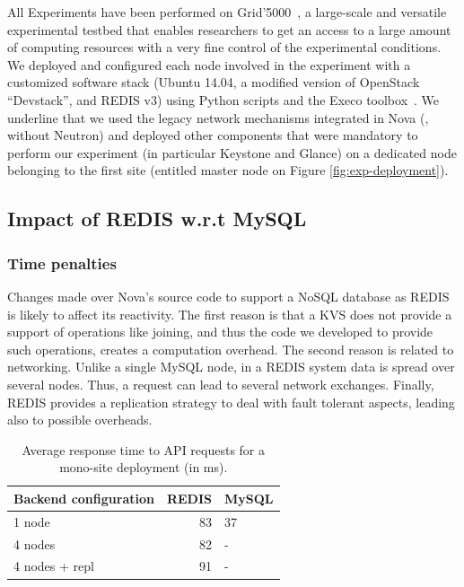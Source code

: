 All Experiments have been performed on Grid'5000~\cite{grid5000}, a large-scale
and versatile experimental testbed that enables researchers to get an access to
a large amount of computing resources %
with a very fine control of the experimental conditions. We deployed and
configured each node involved in the experiment with a customized software stack
(Ubuntu 14.04, a modified version of OpenStack ``Devstack'', and REDIS v3) using
Python scripts and the Execo toolbox~\cite{imbert:hal-00861886}. We underline
that we used the legacy network mechanisms integrated in Nova (\ie, without
Neutron) and deployed other components that were mandatory to perform our
experiment (in particular Keystone and Glance) on a dedicated node belonging to
the first site (entitled master node on Figure \ref{fig:exp-deployment}).

\subsection{Impact of REDIS w.r.t MySQL\label{subsec:monosite_experiments}}

\subsubsection{Time penalties}
Changes made over Nova's source code to support a NoSQL database as REDIS is
likely to affect its reactivity. The first reason is that a KVS does
not provide a support of operations like joining, and thus the code we developed
to provide such operations, creates a computation overhead. The second reason is
related to networking. Unlike a single MySQL node, in a REDIS system data is
spread over several nodes. Thus, a request can lead to several network
exchanges. Finally, REDIS provides a replication strategy to deal with fault
tolerant aspects, leading also to possible overheads.

\begin{table}[htb]
\centering
  \caption{\label{tab:orgtable3}
    Average response time to API requests for a mono-site deployment (in ms).}
\begin{tabular}{lrl}
Backend configuration & REDIS & MySQL\\
\hline
1 node & 83 & 37\\
4 nodes & 82 & -\\
4 nodes + repl & 91 & -\\
\end{tabular}
\end{table}


